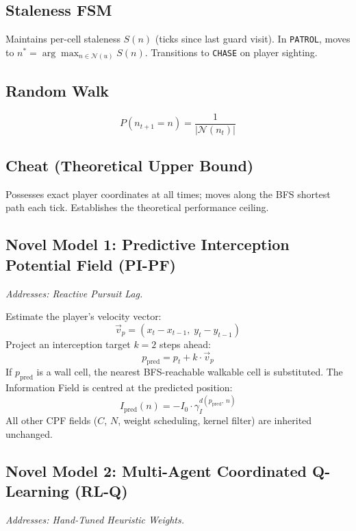 \documentclass[conference,onecolumn]{IEEEtran}
\begin{document}
\subsection{Staleness FSM~\cite{alenezi2020}}
Maintains per-cell staleness $S(n)$ (ticks since last guard visit).
In \texttt{PATROL}, moves to $n^* = \arg\max_{n \in \mathcal{N}(u)} S(n)$.
Transitions to \texttt{CHASE} on player sighting.

\subsection{Random Walk}
\begin{equation}
  P(n_{t+1} = n) = \frac{1}{|\mathcal{N}(n_t)|}
\end{equation}

\subsection{Cheat (Theoretical Upper Bound)}
Possesses exact player coordinates at all times; moves along the BFS
shortest path each tick. Establishes the theoretical performance
ceiling.

\subsection{Novel Model 1: Predictive Interception Potential Field
            (PI-PF)}
\emph{Addresses: Reactive Pursuit Lag.}

Estimate the player's velocity vector:
\begin{equation}
  \vec{v}_p = (x_t - x_{t-1},\; y_t - y_{t-1})
\end{equation}
Project an interception target $k = 2$ steps ahead:
\begin{equation}
  p_{\text{pred}} = p_t + k \cdot \vec{v}_p
\end{equation}
If $p_{\text{pred}}$ is a wall cell, the nearest BFS-reachable
walkable cell is substituted. The Information Field is centred at
the predicted position:
\begin{equation}
  I_{\text{pred}}(n) = -I_0 \cdot \gamma_I^{d(p_{\text{pred}},\, n)}
\end{equation}
All other CPF fields ($C$, $N$, weight scheduling, kernel filter)
are inherited unchanged.

\subsection{Novel Model 2: Multi-Agent Coordinated Q-Learning (RL-Q)}
\emph{Addresses: Hand-Tuned Heuristic Weights.}
\end{document}
